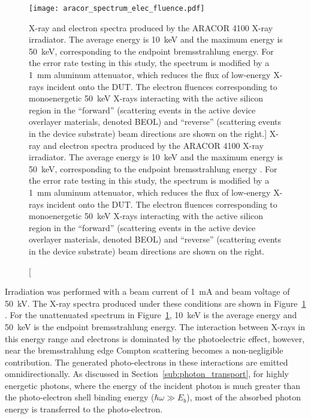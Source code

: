\begin{figure}[tb]
    \centering
        \texttt{[image: aracor\_spectrum\_elec\_fluence.pdf]}
        \caption
        [X-ray and electron spectra produced by the ARACOR 4100 X-ray irradiator. The average energy is 10~keV and the maximum energy is 50~keV, corresponding to the endpoint bremsstrahlung energy. For the error rate testing in this study, the spectrum is modified by a 1~mm aluminum attenuator, which reduces the flux of low-energy X-rays incident onto the DUT. The electron fluences corresponding to monoenergetic 50~keV X-rays interacting with the active silicon region in the ``forward'' (scattering events in the active device overlayer materials, denoted BEOL) and ``reverse'' (scattering events in the device substrate) beam directions are shown on the right.]
        {X-ray and electron spectra produced by the ARACOR 4100 X-ray irradiator. The average energy is 10~keV and the maximum energy is 50~keV, corresponding to the endpoint bremsstrahlung energy \cite{Dozier:1983wx, Fleetwood:1986ug}. For the error rate testing in this study, the spectrum is modified by a 1~mm aluminum attenuator, which reduces the flux of low-energy X-rays incident onto the DUT. The electron fluences corresponding to monoenergetic 50~keV X-rays interacting with the active silicon region in the ``forward'' (scattering events in the active device overlayer materials, denoted BEOL) and ``reverse'' (scattering events in the device substrate) beam directions are shown on the right.}
        \label{fig:aracor_spectrum}
\end{figure}
Irradiation was performed with a beam current of 1~mA and beam voltage of 50~kV. 
The X-ray spectra produced under these conditions are shown in Figure~\ref{fig:aracor_spectrum} \cite{Dozier:1983wx, Fleetwood:1986ug}. 
For the unattenuated spectrum in Figure~\ref{fig:aracor_spectrum}, 10~keV is the average energy and 50~keV is the endpoint bremsstrahlung energy. 
The interaction between X-rays in this energy range and electrons is dominated by the photoelectric effect, however, near the bremsstrahlung edge Compton scattering becomes a non-negligible contribution. 
The generated photo-electrons in these interactions are emitted omnidirectionally.
As discussed in Section~\ref{sub:photon_transport}, for highly energetic photons, where the energy of the incident photon is much greater than the photo-electron shell binding energy ($\hbar \omega \gg E_b$), most of the absorbed photon energy is transferred to the photo-electron.

